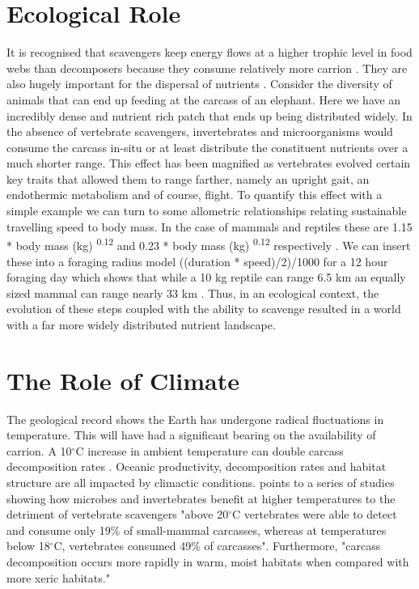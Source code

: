 \documentclass[a4paper,12pt]{article}
\begin{document}
\section*{Ecological Role}
It is recognised that scavengers keep energy flows at a higher trophic level in food webs than decomposers because they consume relatively more carrion \citep{devault2003scavenging}. They are also hugely important for the dispersal of nutrients \citep{benbow2015introduction}. Consider the diversity of animals that can end up feeding at the carcass of an elephant. Here we have an incredibly dense and nutrient rich patch that ends up being distributed widely. In the absence of vertebrate scavengers, invertebrates and microorganisms would consume the carcass in-situ or at least distribute the constituent nutrients over a much shorter range. This effect has been magnified as vertebrates evolved certain key traits that allowed them to range farther, namely an upright gait, an endothermic metabolism and of course, flight. To quantify this effect with a simple example we can turn to some allometric relationships relating sustainable travelling speed to body mass. In the case of mammals and reptiles these are 1.15 * body mass (kg) \textsuperscript{0.12} and 0.23 * body mass (kg) \textsuperscript{0.12}
respectively \citep{ruxton2004obligate}. We can insert these into a foraging radius model ((duration * speed)/2)/1000 for a 12 hour foraging day which shows that while a 10 kg reptile can range 6.5 km an equally sized mammal can range nearly 33 km \citep{Enstipp2006Energetics}. Thus, in an ecological context, the evolution of these steps coupled with the ability to scavenge resulted in a world with a far more widely distributed nutrient landscape. 

\section*{The Role of Climate}
The geological record shows the Earth has undergone radical fluctuations in temperature. This will have had a significant bearing on the availability of carrion. A 10$^{\circ}$C increase in ambient temperature can double carcass decomposition rates \citep{benbow2015introduction}. Oceanic productivity, decomposition rates and habitat structure are all impacted by climactic conditions. \cite{benbow2015introduction} points to a series of studies showing how microbes and invertebrates benefit at higher temperatures to the detriment of vertebrate scavengers "above 20$^{\circ}$C vertebrates were able to detect and consume only 19\% of small-mammal carcasses, whereas at temperatures below 18$^{\circ}$C, vertebrates consumed 49\% of carcasses". Furthermore, "carcass decomposition occurs more rapidly in warm, moist habitats when compared with more xeric habitats." 
\end{document}

